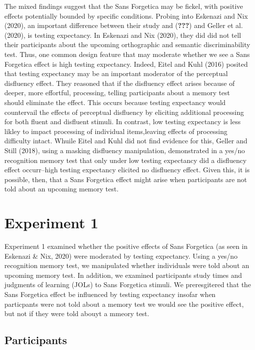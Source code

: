 \documentclass[
  english,
  man]{apa6}
\begin{document}
The mixed findings suggest that the Sans Forgetica may be fickel, with positive effects potentially bounded by specific conditions. Probing into Eskenazi and Nix (2020), an important difference between their study and ({\textbf{???}}) and Geller et al. (2020), is testing expectancy. In Eskenazi and Nix (2020), they did did not tell their participants about the upcoming orthographic and semantic discriminability test. Thus, one common design feature that may moderate whether we see a Sans Forgetica effect is high testing expectancy. Indeed, Eitel and Kuhl (2016) posited that testing expectancy may be an important moderator of the perceptual disfluency effect. They reasoned that if the disfluency effect arises because of deeper, more effortful, processing, telling participants about a memory test should eliminate the effect. This occurs because testing expectancy would countervail the effects of perceptual disfluency by eliciting additional processing for both fluent and disfluent stimuli. In contrast, low testing expectancy is less likley to impact processing of individual items,leaving effects of processing difficulty intact. Whuile Eitel and Kuhl did not find evidence for this, Geller and Still (2018), using a masking disfluency manipulation, demonstrated in a yes/no recognition memory test that only under low testing expectancy did a disfluency effect occurr--high testing expectancy elicited no disfluency effect. Given this, it is possible, then, that a Sans Forgetica effect might arise when participants are not told about an upcoming memory test.

\hypertarget{experiment-1}{%
\section{Experiment 1}\label{experiment-1}}

Experiment 1 examined whether the positive effects of Sans Forgetica (as seen in Eskenazi \& Nix, 2020) were moderated by testing expectancy. Using a yes/no recognition memory test, we manipulated whether individuals were told about an upcoming memory test. In addition, we examined participants study times and judgments of learning (JOLs) to Sans Forgetica stimuli. We preresgitered that the Sans Forgetica effect be influenced by testing expectancy insofar when particpants were not told about a memory test we would see the positive effect, but not if they were told abouyt a mmeory test.

\hypertarget{participants}{%
\subsection{Participants}\label{participants}}
\end{document}
